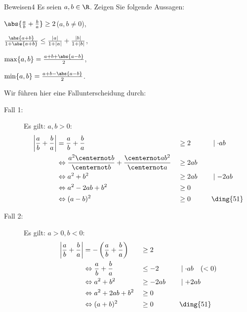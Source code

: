 \begin{aufgabe}{Beweisen}{4}
    Es seien \(a,b \in \R\). Zeigen Sie folgende Aussagen:
    \begin{aufgaben}
        \item \(\abs{\frac{a}{b} + \frac{b}{a}} \geq 2\)\quad(\(a,b \neq 0\)),
        \item \(\frac{\abs{a+b}}{1 + \abs{a + b}} \leq \frac{|a|}{1 + |a|} + \frac{|b|}{1 + |b|}\),
        \item \(\max\{a,b\} = \frac{a+b+\abs{a-b}}{2}\),
        \item \(\min\{a,b\} = \frac{a+b-\abs{a-b}}{2}\).
    \end{aufgaben}\vspace{-1\baselineskip}
\Splitter
\nskip
    \begin{aufgaben}
        \item Wir führen hier eine Fallunterscheidung durch: \begin{description}
        \item[Fall 1: ] Es gilt: $a, b > 0$:  \begin{alignat*}{3}
            \left|\frac{a}{b} + \frac{b}{a}\right|  &= \frac{a}{b} + \frac{b}{a } &&\geq 2 \qquad && \mid \cdot ab\\
            &\Leftrightarrow \frac{a^2 \centernot b}{\centernot b} + \frac{\centernot a b^2}{\centernot a} &&\geq 2 ab \quad &&\\
            &\Leftrightarrow a^2 + b^2 &&\geq 2 ab &&\mid -2 ab \\
            &\Leftrightarrow a^2 - 2ab + b^2 &&\geq 0 \\
            &\Leftrightarrow (a-b)^2 &&\geq 0 && \text{\ding{51}}
        \end{alignat*}
        \item[Fall 2: ] Es gilt: $a > 0, b < 0$: \begin{alignat*}{3}
            \left|\frac{a}{b} + \frac{b}{a}\right|  &= -\left(\frac{a}{b} + \frac{b}{a}\right) &&\geq 2 \qquad && {} \\
            &\Leftrightarrow \frac{a}{b} + \frac{b}{a} &&\leq -2  && \mid \cdot ab \quad (< 0)\\
            &\Leftrightarrow a^2 + b^2 &&\geq -2 ab \quad &&\mid +2 ab \\
            &\Leftrightarrow a^2 + 2ab + b^2 &&\geq 0 \\
            &\Leftrightarrow (a+b)^2 &&\geq 0&& \text{\ding{51}}
        \end{alignat*}

\end{description}
\end{aufgaben}
\end{aufgabe}
